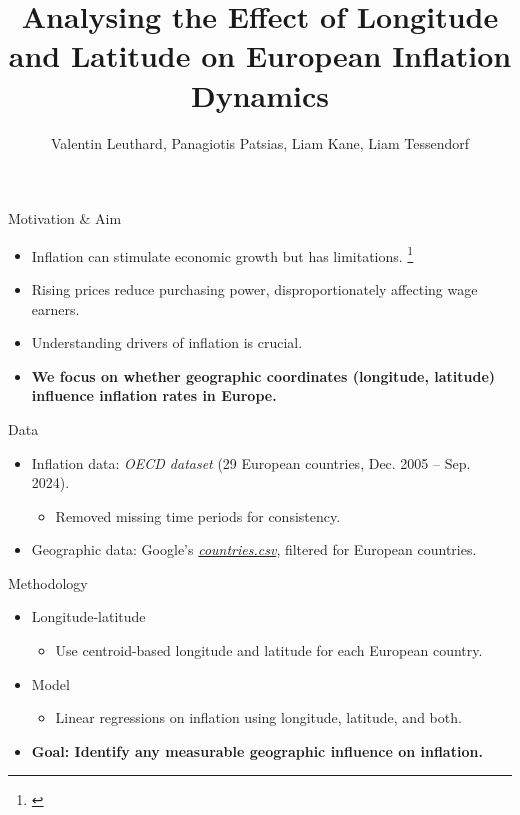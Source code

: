 \documentclass[10pt]{beamer}
\title{Analysing the Effect of Longitude and Latitude on European Inflation Dynamics}
\author{Valentin Leuthard, Panagiotis Patsias, Liam Kane, Liam Tessendorf}
\begin{document}
\begin{frame}
  \titlepage
\end{frame}

\begin{frame}{Motivation \& Aim}
  \begin{itemize}
    \item Inflation can stimulate economic growth but has limitations. \footnote{\cite{TheEffectofInflationonEconomicDevelopment}}

    \item Rising prices reduce purchasing power, disproportionately affecting wage earners. \footnotemark[1]

    \item Understanding drivers of inflation is crucial.
    \vspace{1em}
    \item \textbf{We focus on whether geographic coordinates (longitude, latitude) influence inflation rates in Europe.}
  \end{itemize}
\end{frame}

\begin{frame}{Data}
  \begin{itemize}
    \item Inflation data: \emph{OECD dataset} (29 European countries, Dec. 2005 – Sep. 2024).
    \begin{itemize}    
        \item Removed missing time periods for consistency.
    \end{itemize}
    \item Geographic data: Google’s \href{https://developers.google.com/public-data/docs/canonical/countries_csv}{\emph{countries.csv}}, filtered for European countries.
  \end{itemize}
\end{frame}

\begin{frame}{Methodology}
  \begin{itemize}
    \item Longitude-latitude
    \begin{itemize}
        \item Use centroid-based longitude and latitude for each European country.
    \end{itemize}
    \item Model
    \begin{itemize}
        \item Linear regressions on inflation using longitude, latitude, and both.
    \end{itemize}
    \vspace{1em}
    \item \textbf{Goal: Identify any measurable geographic influence on inflation.}
  \end{itemize}
\end{frame}
\end{document}

